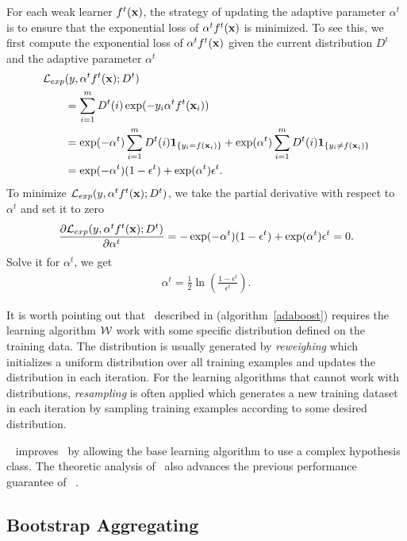 {For each weak learner $f^t(\mathbf {x})$, the strategy of updating the adaptive parameter $\alpha^t$ is to ensure that the exponential loss of $\alpha^tf^t(\mathbf {x})$ is minimized.
To see this, we first compute the exponential loss of $\alpha^tf^t(\mathbf {x})$ given the current distribution $D^t$ and the adaptive parameter $\alpha^t$
\begin{align*}
	\mathcal{L}_{exp}&(y,\alpha^tf^t(\mathbf {x});D^t) \\
	&= \sum_{i=1}^mD^t(i)\exp(-y_i\alpha^tf^t(\mathbf {x}_i))\\
	&=\exp(-\alpha^t)\sum_{i=1}^mD^t(i)\mathbf{1}_{\{y_i=f(\mathbf {x}_i)\}} + \exp(\alpha^t)\sum_{i=1}^mD^t(i)\mathbf{1}_{\{y_i\neq f(\mathbf {x}_i)\}}\\
	&=\exp(-\alpha^t)(1-\epsilon^t) + \exp(\alpha^t)\epsilon^t.
\end{align*}
To minimize $\mathcal{L}_{exp}(y,\alpha^tf^t(\mathbf {x});D^t)$, we take the partial derivative with respect to $\alpha^t$ and set it to zero
\begin{align*}
	\frac{\partial\mathcal{L}_{exp}(y,\alpha^tf^t(\mathbf {x});D^t)}{\partial\alpha^t} = -\exp(-\alpha^t)(1-\epsilon^t) + \exp(\alpha^t)\epsilon^t=0.
\end{align*}
Solve it for $\alpha^t$, we get
\begin{align*}
	\alpha^{t} = \frac{1}{2}\ln\left(\frac{1-\epsilon^t}{\epsilon^t}\right).
\end{align*}

It is worth pointing out that \adaboost\ described in (algorithm~\ref{adaboost}) requires the learning algorithm $\mathcal{W}$ work with some specific distribution defined on the training data.
The distribution is usually generated by \textit{reweighing} which initializes a uniform distribution over all training examples and updates the distribution in each iteration.
For the learning algorithms that cannot work with distributions, \textit{resampling} is often applied which generates a new training dataset in each iteration by sampling training examples according to some desired distribution. 

\deepboosting\ \citep{Cortes14deep} improves \adaboost\ by allowing the base learning algorithm to use a complex hypothesis class.
The theoretic analysis of \deepboosting\ also advances the previous performance guarantee of \adaboost\ \citep{Schapire97boosting,Koltchinskii00empirical}.




\subsection{Bootstrap Aggregating} \label{sc_ba}

}
